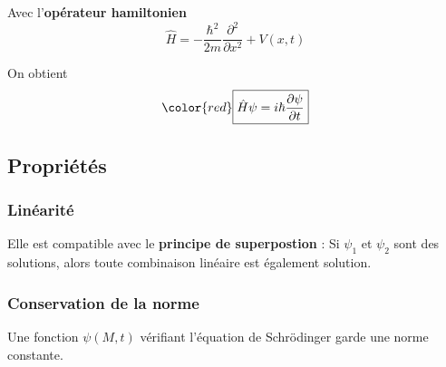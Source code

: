 \begin{Theorem}{}{}
Avec l'\textbf{opérateur hamiltonien} 
\begin{equation}
  \hat{H} = - \frac{\hbar ^{2}}{2m}  \frac{\partial ^{2}}{\partial x ^{2}}  + V(x,t)
\end{equation}

On obtient 
\begin{equation}
  \color{red}\boxed{\hat{H} \psi = i \hbar \frac{\partial \psi}{\partial t} }
\end{equation}
\end{Theorem}


\subsection{Propriétés} %



\subsubsection{Linéarité} %
\label{sub:Linéarité}

Elle est compatible avec le \textbf{principe de superpostion} : Si $\psi_1$ et $\psi_2$ sont des solutions, alors toute combinaison linéaire est également solution.

\subsubsection{Conservation de la norme} %
\label{sub:Conservation de la norme}

\begin{Theorem}{}{}
Une fonction $\psi(M,t)$ vérifiant l'équation de Schrödinger garde une norme constante.
\end{Theorem}

